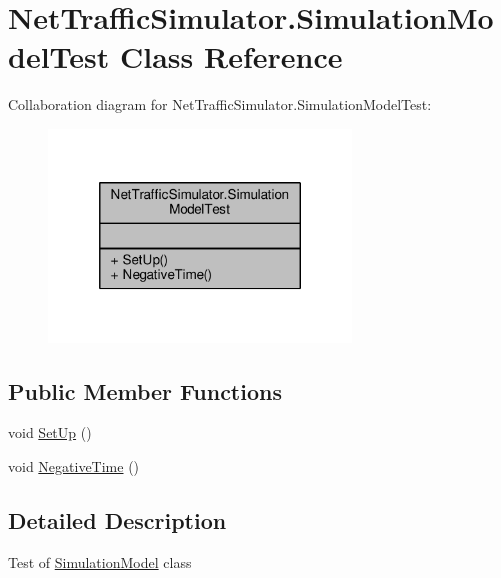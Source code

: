\hypertarget{classNetTrafficSimulator_1_1SimulationModelTest}{\section{Net\-Traffic\-Simulator.\-Simulation\-Model\-Test Class Reference}
\label{classNetTrafficSimulator_1_1SimulationModelTest}
}


Collaboration diagram for Net\-Traffic\-Simulator.\-Simulation\-Model\-Test\-:\nopagebreak
\begin{figure}[H]
\begin{center}
\leavevmode
\includegraphics[width=228pt]{classNetTrafficSimulator_1_1SimulationModelTest__coll__graph}
\end{center}
\end{figure}
\subsection*{Public Member Functions}
\begin{DoxyCompactItemize}
\item 
void \hyperlink{classNetTrafficSimulator_1_1SimulationModelTest_ae392974e4037e2199fbdb83a3d5da739}{Set\-Up} ()
\item 
void \hyperlink{classNetTrafficSimulator_1_1SimulationModelTest_a6516fcb98b160ea8240383a0ec82483c}{Negative\-Time} ()
\end{DoxyCompactItemize}


\subsection{Detailed Description}
Test of \hyperlink{classNetTrafficSimulator_1_1SimulationModel}{Simulation\-Model} class 

